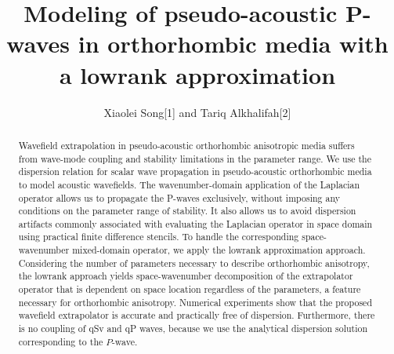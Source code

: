 
\title{Modeling of pseudo-acoustic P-waves in orthorhombic media with a lowrank approximation}

\renewcommand{\footnotemark}{} 

\author{Xiaolei Song\footnotemark[1] and Tariq Alkhalifah\footnotemark[2]}

\address{
\footnotemark[1]Bureau of Economic Geology \\
Jackson School of Geosciences \\
The University of Texas at Austin \\
University Station, Box X \\
Austin, TX 78713-8924 \\
USA\\
songxl@utexas.edu\\
\footnotemark[2]Physical Sciences and Engineering \\
King Abdullah University of Science and Technology \\
Mail box \# 1280 \\ 
Thuwal 23955-6900 \\
Saudi Arabia\\
tariq.alkhalifah@kaust.edu.sa
}

\maketitle

\begin{abstract}
Wavefield extrapolation in pseudo-acoustic orthorhombic anisotropic media suffers from 
wave-mode coupling and stability limitations in the parameter range.
We use the dispersion relation for scalar wave propagation in pseudo-acoustic orthorhombic media to model
acoustic wavefields. The wavenumber-domain application of the Laplacian operator allows us to propagate the P-waves exclusively,
without imposing any conditions on the parameter range of stability. It also allows us to avoid dispersion artifacts commonly associated
with evaluating the Laplacian operator in space domain using practical finite difference stencils.
To handle the corresponding space-wavenumber mixed-domain operator,
we apply the lowrank approximation approach. Considering the number of parameters necessary to describe orthorhombic anisotropy,
the lowrank approach yields space-wavenumber decomposition of the extrapolator operator that is dependent on space location regardless of the parameters,
a feature necessary for orthorhombic anisotropy.
Numerical experiments show that the proposed wavefield extrapolator is accurate and practically free of dispersion.
Furthermore, there is no coupling of qSv and qP waves,
because we use the analytical dispersion solution corresponding to the $P$-wave. 
\end{abstract}

